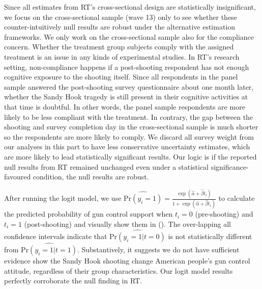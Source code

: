 \documentclass[11pt]{article}
\begin{document}
Since all estimates from RT’s cross-sectional design are statistically insignificant, we focus on the cross-sectional sample (wave 13) only to see whether these counter-intuitively null results are robust under the alternative estimation frameworks. We only work on the cross-sectional sample also for the compliance concern. Whether the treatment group subjects comply with the assigned treatment is an issue in any kinds of experimental studies. In RT’s research setting, non-compliance happens if a post-shooting respondent has not enough cognitive exposure to the shooting itself. Since all respondents in the panel sample answered the post-shooting survey questionnaire about one month later, whether the Sandy Hook tragedy is still present in their cognitive activities at that time is doubtful. In other words, the panel sample respondents are more likely to be less compliant with the treatment. In contrary, the gap between the shooting and survey completion day in the cross-sectional sample is much shorter so the respondents are more likely to comply. We discard all survey weight from our analyses in this part to have less conservative uncertainty estimates, which are more likely to lead statistically significant results. Our logic is if the reported null results from RT remained unchanged even under a statistical significance-favoured condition, the null results are robust.

After running the logit model, we use \(\displaystyle{\widehat{{\text{Pr}(y_i = 1)}} = \frac{\exp(\hat{\alpha} + \hat{\beta} t_{i})}{1 + \exp(\hat{\alpha} + \hat{\beta} t_{i})}}\) to calculate the predicted probability of gun control support when \(t_i = 0\) (pre-shooting) and \(t_i = 1\) (post-shooting) and visually show them in (). The over-lapping all confidence intervals indicate that \(\widehat{\text{Pr}(y_i = 1|t = 0)}\) is not statistically different from \(\widehat{\text{Pr}(y_i = 1|t = 1)}\). Substantively, it suggests we do not have sufficient evidence show the Sandy Hook shooting change American people’s gun control attitude, regardless of their group characteristics. Our logit model results perfectly corroborate the null finding in RT.
\end{document}
